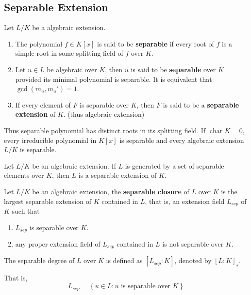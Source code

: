 \subsection{Separable Extension} %
\begin{definition}
    Let $L/K$ be a algebraic extension.
    \begin{enumerate}
        \item
              The polynomial $f\in K[x]$ is said to be \textbf{separable} if every root of $f$ is a simple root in some splitting field of $f$ over $K$.

        \item
              Let $u \in L$ be algebraic over $K$, then $u$ is said to be \textbf{separable} over $K$ provided its minimal polynomial is separable.
              It is equivalent  that $\gcd\left(m_u,m_u'\right)=1$.

        \item
              If every element of $F$ is separable over $K$, then $F$ is said to be a \textbf{separable extension} of $K$. (thus algebraic extension)
    \end{enumerate}
    \begin{remark}
        Thus separable polynomial has distinct roots in its splitting field.
        If $\operatorname{char} K =0$, every irreducible polynomial in $K[x]$ is separable and every algebraic extension $L/K$ is separable.
    \end{remark}
\end{definition}





\begin{proposition}
    Let $L/K$ be an algebraic extension.
    If $L$ is generated by a set of separable elements over $K$, then $L$ is a separable extension of $K$.
\end{proposition}

\begin{definition}
    Let $L/K$ be an algebraic extension, the \textbf{separable closure} of $L$ over $K$ is the largest separable extension of $K$ contained in $L$, that is, an extension field $L_{sep}$ of $K$ such that
    \begin{enumerate}[label=(\roman*)]
        \item
              $L_{sep}$ is separable over $K$.
        \item
              any proper extension field of $L_{sep}$ contained in $L$ is not separable over $K$.
    \end{enumerate}
    The separable degree of $L$ over $K$ is defined as $[L_{sep}: K]$, denoted by $[L: K]_s$.
    \begin{remark}
        That is,
        \begin{equation*}
            L_{sep}
            =
            \left\{u \in L: u \text { is separable over } K\right\}
        \end{equation*}
    \end{remark}
\end{definition}



